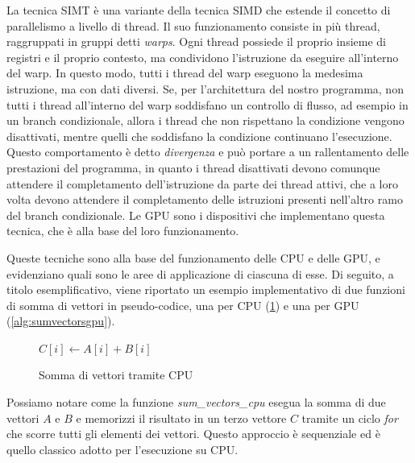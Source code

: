 La tecnica SIMT è una variante della tecnica SIMD che estende il concetto di parallelismo
a livello di thread. Il suo funzionamento consiste in più thread, raggruppati in
gruppi detti \textit{warps}. Ogni thread possiede il proprio insieme di registri
e il proprio contesto, ma condividono l'istruzione da eseguire all'interno del
warp. In questo modo, tutti i thread del warp eseguono la medesima istruzione, ma
con dati diversi. Se, per l'architettura del nostro programma, non tutti i
thread all'interno del warp soddisfano un controllo di flusso, ad esempio in un branch
condizionale, allora i thread che non rispettano la condizione vengono
disattivati, mentre quelli che soddisfano la condizione continuano l'esecuzione.
Questo comportamento è detto \textit{divergenza} e può portare a un rallentamento
delle prestazioni del programma, in quanto i thread disattivati devono comunque
attendere il completamento dell'istruzione da parte dei thread attivi, che a loro
volta devono attendere il completamento delle istruzioni presenti nell'altro ramo
del branch condizionale. Le GPU sono i dispositivi che implementano questa
tecnica, che è alla base del loro funzionamento.

\vspace{1em}

Queste tecniche sono alla base del funzionamento delle CPU e delle GPU, e evidenziano
quali sono le aree di applicazione di ciascuna di esse. Di seguito, a titolo esemplificativo,
viene riportato un esempio implementativo di due funzioni di somma di vettori in
pseudo-codice, una per CPU (\ref{alg:sumvectorscpu}) e una per GPU (\ref{alg:sumvectorsgpu}).

\begin{figure}[h!]
  \vspace{1em}
  \begin{algorithm}
    [H]
    \caption{Somma di vettori tramite CPU}
    \label{alg:sumvectorscpu}
    \begin{algorithmic}
        \State
      $C[i] \gets A[i] + B[i]$ \EndFor \EndFunction
    \end{algorithmic}
  \end{algorithm}
  \vspace{1em}
\end{figure}

Possiamo notare come la funzione \textit{sum\_vectors\_cpu} esegua la somma di due
vettori $A$ e $B$ e memorizzi il risultato in un terzo vettore $C$ tramite un ciclo
\textit{for} che scorre tutti gli elementi dei vettori. Questo approccio è sequenziale
ed è quello classico adotto per l'esecuzione su CPU.

